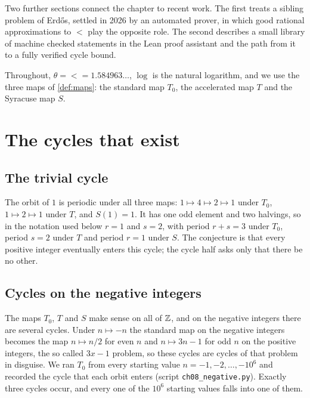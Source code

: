 Two further sections connect the chapter to recent work. The first treats a
sibling problem of Erd\H{o}s, settled in 2026 by an automated prover, in which
good rational approximations to $\lt$ play the opposite role. The second describes a
small library of machine checked statements in the Lean proof assistant and
the path from it to a fully verified cycle bound.

Throughout, $\theta=\lt=1.584963\ldots$, $\log$ is the natural logarithm, and we use the three maps of
\cref{def:maps}: the standard map $T_0$, the accelerated map $T$ and the
Syracuse map $S$.

\section{The cycles that exist}\label{sec:ch8:exist}

\subsection{The trivial cycle}

The orbit of $1$ is periodic under all three maps: $1\mapsto4\mapsto2\mapsto1$
under $T_0$, $1\mapsto2\mapsto1$ under $T$, and $S(1)=1$. It has one odd
element and two halvings, so in the notation used below $r=1$ and $s=2$, with
period $r+s=3$ under $T_0$, period $s=2$ under $T$ and period $r=1$ under $S$.
The conjecture is that every positive integer eventually enters this cycle;
the cycle half asks only that there be no other.

\subsection{Cycles on the negative integers}

The maps $T_0$, $T$ and $S$ make sense on all of $\mathbb{Z}$, and on the negative
integers there are several cycles. Under $n\mapsto-n$ the standard map on the
negative integers becomes the map $n\mapsto n/2$ for even $n$ and
$n\mapsto3n-1$ for odd $n$ on the positive integers, the so called $3x-1$
problem, so these cycles are cycles of that problem in disguise. We ran $T_0$
from every starting value $n=-1,-2,\dots,-10^{6}$ and recorded the cycle that
each orbit enters (script \texttt{ch08\_negative.py}). Exactly three cycles
occur, and every one of the $10^6$ starting values falls into one of them.

